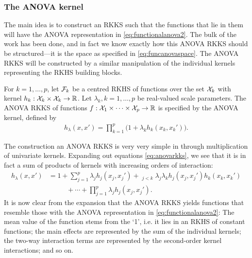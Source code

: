\subsubsection{The ANOVA kernel}

The main idea is to construct an RKKS such that the functions that lie in them will have the ANOVA representation in \cref{eq:functionalanova2}.
The bulk of the work has been done, and in fact we know exactly how this ANOVA RKKS should be structured---it is the space as specified in \cref{eq:funcanovaspace}. 
The ANOVA RKKS will be constructed by a similar manipulation of the individual kernels representing the RKHS building blocks.

\begin{definition}\label{def:anovarkks}
  For $k=1,\dots,p$, let ${\mathcal F}_k$ be a centred RKHS of functions over the set ${\mathcal X}_k$ with kernel $h_k:{\mathcal X}_k\times{\mathcal X}_k\to\mathbb{R}$. 
  Let $\lambda_k, k=1,\dots,p$ be real-valued scale parameters.
  The ANOVA RKKS of functions $f:{\mathcal X}_1\times\cdots\times{\mathcal X}_p\to\mathbb{R}$ is specified by the ANOVA kernel, defined by
  \begin{align}\label{eq:anovarkks}
    h_\lambda(x,x') = \prod_{k=1}^p \big( 1 + \lambda_k h_k(x_k,x_k') \big).
  \end{align}
\end{definition}

The construction an ANOVA RKKS is very very simple in through multiplication of univariate kernels.
Expanding out equations \cref{eq:anovarkks}, we see that it is in fact a sum of products of kernels with increasing orders of interaction:
\begin{align*}
  h_\lambda(x,x') 
  &= 1 + \sum_{j=1}^p \lambda_j h_j(x_j,x_j') + \mathop{\sum_{j,k=1}^p}_{j<k} \lambda_j\lambda_k h_j(x_j,x_j')h_k(x_k,x_k') \\
  &\phantom{==} + \cdots + \prod_{j=1}^p \lambda_j h_j(x_j,x_j').
\end{align*}
It is now clear from the expansion that the ANOVA RKKS yields functions that resemble those with the ANOVA representation in \cref{eq:functionalanova2}:
The mean value of the function stems from the `1', i.e. it lies in an RKHS of constant functions; the main effects are represented by the sum of the individual kernels; the two-way interaction terms are represented by the second-order kernel interactions; and so on.


